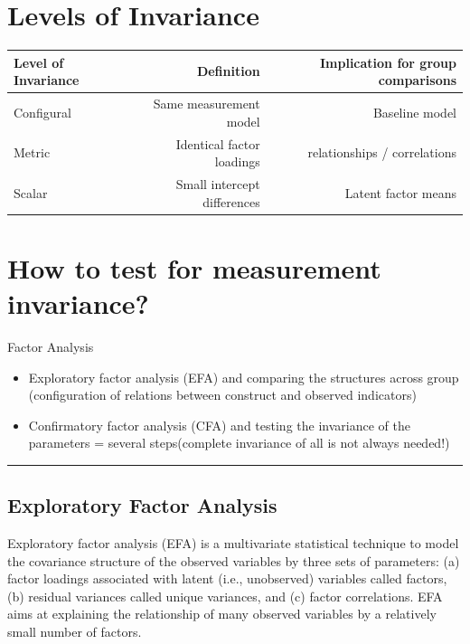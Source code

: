 \documentclass[
]{book}
\begin{document}
\hypertarget{levels-of-invariance}{%
\section{Levels of Invariance}\label{levels-of-invariance}}

\begin{longtable}[]{@{}lrr@{}}
\toprule
Level of Invariance & Definition & Implication for group comparisons\tabularnewline
\midrule
\endhead
Configural & Same measurement model & Baseline model\tabularnewline
Metric & Identical factor loadings & relationships / correlations\tabularnewline
Scalar & Small intercept differences & Latent factor means\tabularnewline
\bottomrule
\end{longtable}

\hypertarget{how-to-test-for-measurement-invariance}{%
\section{How to test for measurement invariance?}\label{how-to-test-for-measurement-invariance}}

Factor Analysis

\begin{itemize}
\item
  Exploratory factor analysis (EFA) and comparing the structures across group (configuration of relations between construct and observed indicators)
\item
  Confirmatory factor analysis (CFA) and testing the invariance of the parameters = several steps(complete invariance of all is not always needed!)
\end{itemize}

\begin{center}\rule{0.5\linewidth}{0.5pt}\end{center}

\hypertarget{exploratory-factor-analysis}{%
\subsection{Exploratory Factor Analysis}\label{exploratory-factor-analysis}}

Exploratory factor analysis (EFA) is a multivariate statistical technique to model the covariance structure of the observed variables by three sets of parameters: (a) factor loadings associated with latent (i.e., unobserved) variables called factors, (b) residual variances called unique variances, and (c) factor correlations. EFA aims at explaining the relationship of many observed variables by a relatively small number of factors.
\end{document}
